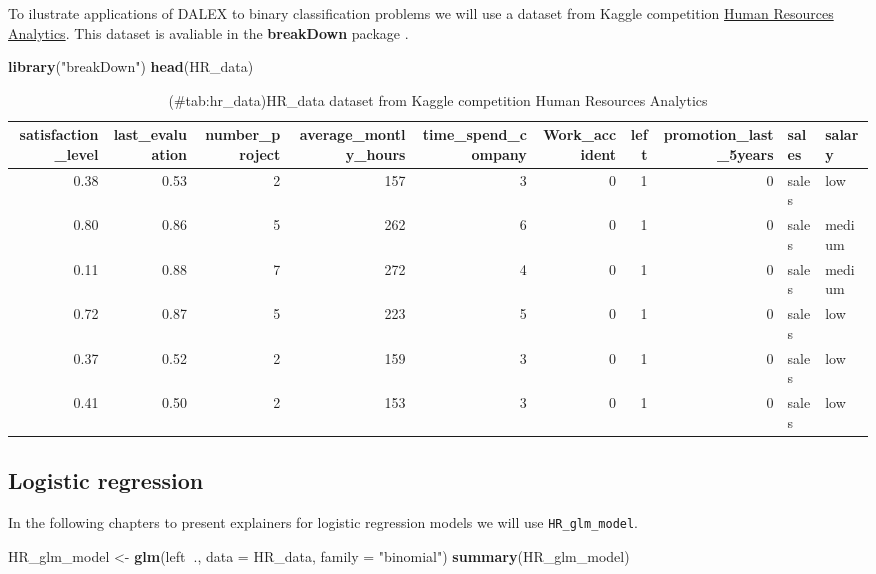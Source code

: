 \documentclass[]{book}
\newenvironment{Shaded}{\begin{snugshade}}{\end{snugshade}}
\newcommand{\KeywordTok}[1]{\textcolor[rgb]{0.13,0.29,0.53}{\textbf{#1}}}
\newcommand{\DataTypeTok}[1]{\textcolor[rgb]{0.13,0.29,0.53}{#1}}
\newcommand{\StringTok}[1]{\textcolor[rgb]{0.31,0.60,0.02}{#1}}
\newcommand{\OperatorTok}[1]{\textcolor[rgb]{0.81,0.36,0.00}{\textbf{#1}}}
\newcommand{\NormalTok}[1]{#1}
\theoremstyle{definition}
\theoremstyle{definition}
\theoremstyle{definition}
\theoremstyle{remark}
\begin{document}
To ilustrate applications of DALEX to binary classification problems we
will use a dataset from Kaggle competition
\href{https://www.kaggle.com/ludobenistant/hr-analytics/data}{Human
Resources Analytics}. This dataset is avaliable in the
\textbf{breakDown} package \citep{breakDown}.

\begin{Shaded}
\begin{Highlighting}[]
\KeywordTok{library}\NormalTok{(}\StringTok{"breakDown"}\NormalTok{)}
\KeywordTok{head}\NormalTok{(HR_data)}
\end{Highlighting}
\end{Shaded}

\begin{table}

\caption{(\#tab:hr_data)HR_data dataset from Kaggle competition Human Resources Analytics}
\centering
\begin{tabular}[t]{r|r|r|r|r|r|r|r|l|l}
\hline
satisfaction\_level & last\_evaluation & number\_project & average\_montly\_hours & time\_spend\_company & Work\_accident & left & promotion\_last\_5years & sales & salary\\
\hline
0.38 & 0.53 & 2 & 157 & 3 & 0 & 1 & 0 & sales & low\\
\hline
0.80 & 0.86 & 5 & 262 & 6 & 0 & 1 & 0 & sales & medium\\
\hline
0.11 & 0.88 & 7 & 272 & 4 & 0 & 1 & 0 & sales & medium\\
\hline
0.72 & 0.87 & 5 & 223 & 5 & 0 & 1 & 0 & sales & low\\
\hline
0.37 & 0.52 & 2 & 159 & 3 & 0 & 1 & 0 & sales & low\\
\hline
0.41 & 0.50 & 2 & 153 & 3 & 0 & 1 & 0 & sales & low\\
\hline
\end{tabular}
\end{table}

\subsection{Logistic regression}\label{logistic-regression}

In the following chapters to present explainers for logistic regression
models we will use \texttt{HR\_glm\_model}.

\begin{Shaded}
\begin{Highlighting}[]
\NormalTok{HR_glm_model <-}\StringTok{ }\KeywordTok{glm}\NormalTok{(left}\OperatorTok{~}\NormalTok{., }\DataTypeTok{data =}\NormalTok{ HR_data, }\DataTypeTok{family =} \StringTok{"binomial"}\NormalTok{)}
\KeywordTok{summary}\NormalTok{(HR_glm_model)}
\end{Highlighting}
\end{Shaded}
\end{document}
